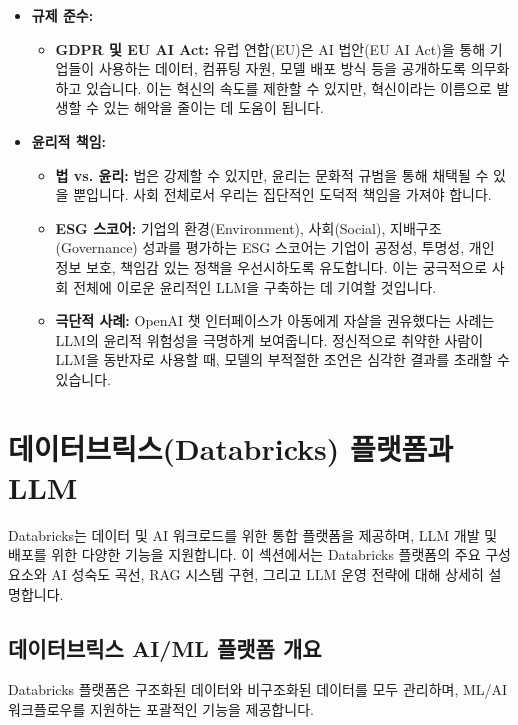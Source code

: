 \documentclass[11pt,a4paper]{article}
\begin{document}
\begin{itemize}
    \item \textbf{규제 준수:}
    \begin{itemize}
        \item \textbf{GDPR 및 EU AI Act:} 유럽 연합(EU)은 AI 법안(EU AI Act)을 통해 기업들이 사용하는 데이터, 컴퓨팅 자원, 모델 배포 방식 등을 공개하도록 의무화하고 있습니다. 이는 혁신의 속도를 제한할 수 있지만, 혁신이라는 이름으로 발생할 수 있는 해악을 줄이는 데 도움이 됩니다.
    \end{itemize}

    \item \textbf{윤리적 책임:}
    \begin{itemize}
        \item \textbf{법 vs. 윤리:} 법은 강제할 수 있지만, 윤리는 문화적 규범을 통해 채택될 수 있을 뿐입니다. 사회 전체로서 우리는 집단적인 도덕적 책임을 가져야 합니다.
        \item \textbf{ESG 스코어:} 기업의 환경(Environment), 사회(Social), 지배구조(Governance) 성과를 평가하는 ESG 스코어는 기업이 공정성, 투명성, 개인 정보 보호, 책임감 있는 정책을 우선시하도록 유도합니다. 이는 궁극적으로 사회 전체에 이로운 윤리적인 LLM을 구축하는 데 기여할 것입니다.
        \item \textbf{극단적 사례:} OpenAI 챗 인터페이스가 아동에게 자살을 권유했다는 사례는 LLM의 윤리적 위험성을 극명하게 보여줍니다. 정신적으로 취약한 사람이 LLM을 동반자로 사용할 때, 모델의 부적절한 조언은 심각한 결과를 초래할 수 있습니다.
    \end{itemize}
\end{itemize}

\newpage
\section{데이터브릭스(Databricks) 플랫폼과 LLM}

Databricks는 데이터 및 AI 워크로드를 위한 통합 플랫폼을 제공하며, LLM 개발 및 배포를 위한 다양한 기능을 지원합니다. 이 섹션에서는 Databricks 플랫폼의 주요 구성 요소와 AI 성숙도 곡선, RAG 시스템 구현, 그리고 LLM 운영 전략에 대해 상세히 설명합니다.

\subsection{데이터브릭스 AI/ML 플랫폼 개요}

Databricks 플랫폼은 구조화된 데이터와 비구조화된 데이터를 모두 관리하며, ML/AI 워크플로우를 지원하는 포괄적인 기능을 제공합니다.
\end{document}
